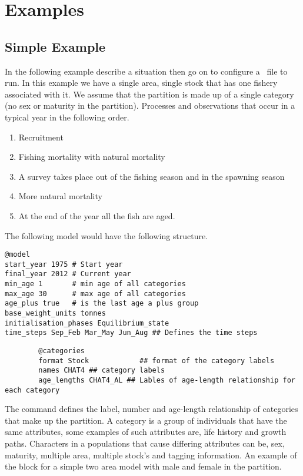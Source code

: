 \section{Examples}\label{Sec:examples}

\subsection{Simple Example}\label{Sec:simp}
In the following example describe a situation then go on to configure a \CNAME\ file to run. In this example we have a single area, single stock that has one fishery associated with it. We assume that the partition is made up of a single category (no sex or maturity in the partition). Processes and observations that occur in a typical year in the following order. \\
\begin{enumerate}
	\item Recruitment
	\item Fishing mortality with natural mortality
	\item A survey takes place out of the fishing season and in the spawning season
	\item More natural mortality
	\item At the end of the year all the fish are aged.
\end{enumerate}

The following model would have the following structure.

{\small{\begin{verbatim}
@model
start_year 1975 # Start year
final_year 2012 # Current year
min_age 1		# min age of all categories
max_age 30		# max age of all categories
age_plus true	# is the last age a plus group
base_weight_units tonnes
initialisation_phases Equilibrium_state
time_steps Sep_Feb Mar_May Jun_Aug ## Defines the time steps
\end{verbatim}}}



{\small{\begin{verbatim}
		@categories
		format Stock			## format of the category labels
		names CHAT4 ## category labels
		age_lengths CHAT4_AL ## Lables of age-length relationship for each category
		\end{verbatim}}}


The  command defines the label, number and age-length relationship of categories that make up the partition. A category is a group of individuals that have the same attributes, some examples of such attributes are, life history and growth paths. Characters in a populations that cause differing attributes can be, sex, maturity, multiple area, multiple stock's and tagging information. An example of the  block for a simple two area model with male and female in the partition.


